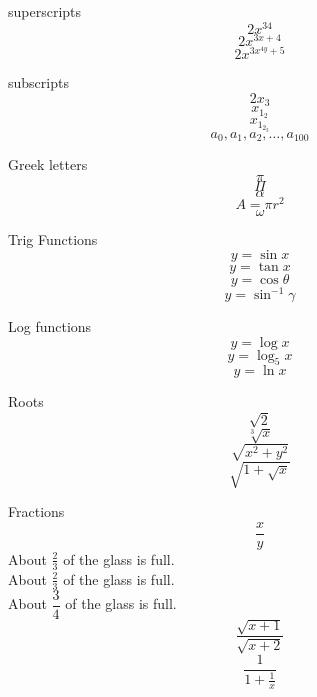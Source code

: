 \documentclass[12pt]{article}
\begin{document}
superscripts 
$$2x^{34}$$
$$2x^{3x + 4}$$
$$2x^{3x^{4y} + 5} $$

subscripts
$$2x_3$$
$$x_{1_2} $$
$$x_{1_{2_3}} $$
$$a_0, a_1, a_2, \ldots, a_{100} $$

Greek letters
$$\pi$$
$$\Pi$$
$$\alpha$$
$$A = \pi r^2$$
$$\omega$$

Trig Functions
$$y = \sin x$$
$$y = \tan x$$
$$y = \cos \theta$$
$$y = \sin^{-1} \gamma$$

Log functions
$$y = \log x$$
$$y = \log_5 x$$
$$y = \ln x$$

Roots
$$\sqrt{2}$$
$$\sqrt[3]{x}$$
$$\sqrt{x^2 + y^2}$$
$$\sqrt{1 + \sqrt{x}}$$

Fractions
$$\frac{x}{y}$$
About $\frac{2}{3}$ of the glass is full.\\[16pt]
About $\displaystyle\frac{2}{3}$ of the glass is full.\\[6pt]
About $\dfrac{3}{4}$ of the glass is full.
$$\frac{\sqrt{x+1}}{\sqrt{x+2}} $$
$$\frac{1}{1 + \frac{1}{x}}$$
\end{document}
